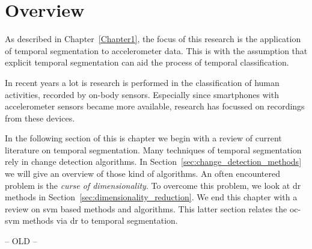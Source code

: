 \section{Overview}\label{sec:literature_review_overview}
As described in Chapter~\ref{Chapter1}, the focus of this research is the application of temporal segmentation to accelerometer data.
This is with the assumption that explicit temporal segmentation can aid the process of temporal classification.


In recent years a lot is research is performed in the classification of human activities, recorded by on-body sensors.
Especially since smartphones with accelerometer sensors became more available, research has focussed on recordings from these devices.


In the following section of this is chapter we begin with a review of current literature on temporal segmentation.
Many techniques of temporal segmentation rely in change detection algorithms.
In Section~\ref{sec:change_detection_methods} we will give an overview of those kind of algorithms.
An often encountered problem is the \emph{curse of dimensionality}.
To overcome this problem, we look at \gls{dr} methods in Section~\ref{sec:dimensionality_reduction}.
We end this chapter with a review on \gls{svm} based methods and algorithms.
This latter section relates the \gls{oc-svm} methods via \gls{dr} to temporal segmentation.








-- OLD --







